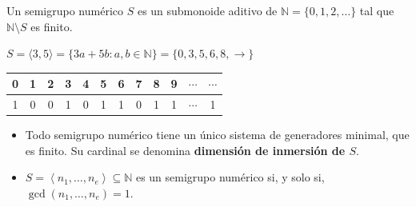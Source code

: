 \documentclass[10pt,compress]{beamer}
\begin{document}
\begin{frame}
  \begin{definition}
    Un semigrupo numérico $S$ es un submonoide aditivo de $\mathbb{N} = \{0, 1, 2, \ldots\}$ tal que
    $\mathbb{N} \setminus S$ es finito.
  \end{definition}

  \begin{example}
    \centering
    $S = \langle 3,5 \rangle = \{3 a + 5 b : a,b \in \mathbb{N}\} = \{0, 3, 5, 6, 8, \rightarrow\}$
    \begin{table}
      \begin{tabular}{|c|c|c|c|c|c|c|c|c|c|c|c|}
        \hline
        0 & 1 & 2 & 3 & 4 & 5 & 6 & 7 & 8 & 9 & $\cdots$ & $\cdots$ \\
        \hline
        \hline
        1 & 0 & 0 & 1 & 0 & 1 & 1 & 0 & 1 & 1 & $\cdots$ & 1 \\
        \hline
      \end{tabular}
    \end{table}
  \end{example}

  \begin{proposition}
    \begin{itemize}
    \item Todo semigrupo numérico tiene un único sistema de generadores minimal, que es finito. Su cardinal se denomina \textbf{dimensión de inmersión de $S$}.
    \item $S = \left\langle n_1, \ldots, n_e \right\rangle \subseteq \mathbb{N}$ es un semigrupo
      numérico si, y solo si, $\gcd(n_1, \ldots, n_e) = 1$.
    \end{itemize}
  \end{proposition}
\end{frame}
\end{document}
